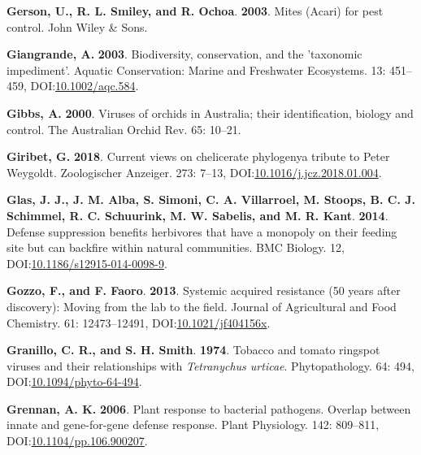 \documentclass[12pt,final,CPage]{ufthesis}
\newlength{\cslhangindent}
\newenvironment{CSLReferences}[2] %
{%
	\setlength{\parindent}{0pt}
	\ifodd #1 \everypar{\setlength{\hangindent}{\cslhangindent}}\ignorespaces\fi
	\ifnum #2 > 0
	\setlength{\parskip}{#2\baselineskip}
	\fi
}%
{}
\begin{document}
{\begin{CSLReferences}{1}{0}
  \leavevmode{}%
  \textbf{Gerson, U., R. L. Smiley, and R. Ochoa}. \textbf{2003}. Mites ({Acari}) for pest control. John Wiley \& Sons.

  \leavevmode{}%
  \textbf{Giangrande, A.} \textbf{2003}. Biodiversity, conservation, and the 'taxonomic impediment'. Aquatic Conservation: Marine and Freshwater Ecosystems. 13: 451--459, DOI:\href{https://doi.org/10.1002/aqc.584}{10.1002/aqc.584}.

  \leavevmode{}%
  \textbf{Gibbs, A.} \textbf{2000}. Viruses of orchids in {Australia}; their identification, biology and control. The {Australia}n Orchid Rev. 65: 10--21.

  \leavevmode{}%
  \textbf{Giribet, G.} \textbf{2018}. Current views on chelicerate phylogeny{\textemdash}a tribute to {Peter Weygoldt}. Zoologischer Anzeiger. 273: 7--13, DOI:\href{https://doi.org/10.1016/j.jcz.2018.01.004}{10.1016/j.jcz.2018.01.004}.

  \leavevmode{}%
  \textbf{Glas, J. J., J. M. Alba, S. Simoni, C. A. Villarroel, M. Stoops, B. C. J. Schimmel, R. C. Schuurink, M. W. Sabelis, and M. R. Kant}. \textbf{2014}. Defense suppression benefits herbivores that have a monopoly on their feeding site but can backfire within natural communities. {BMC} Biology. 12, DOI:\href{https://doi.org/10.1186/s12915-014-0098-9}{10.1186/s12915-014-0098-9}.

  \leavevmode{}%
  \textbf{Gozzo, F., and F. Faoro}. \textbf{2013}. Systemic acquired resistance (50 years after discovery): Moving from the lab to the field. Journal of Agricultural and Food Chemistry. 61: 12473--12491, DOI:\href{https://doi.org/10.1021/jf404156x}{10.1021/jf404156x}.

  \leavevmode{}%
  \textbf{Granillo, C. R., and S. H. Smith}. \textbf{1974}. Tobacco and tomato ringspot viruses and their relationships with {\emph{Tetranychus urticae}}. Phytopathology. 64: 494, DOI:\href{https://doi.org/10.1094/phyto-64-494}{10.1094/phyto-64-494}.

  \leavevmode{}%
  \textbf{Grennan, A. K.} \textbf{2006}. Plant response to bacterial pathogens. Overlap between innate and gene-for-gene defense response. Plant Physiology. 142: 809--811, DOI:\href{https://doi.org/10.1104/pp.106.900207}{10.1104/pp.106.900207}.


\end{CSLReferences}}
\end{document}
